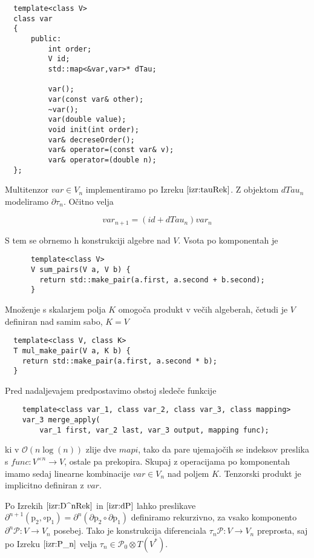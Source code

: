 \documentclass{article}
\newcommand{\dP}{\mathcal{P}}
\newcommand{\D}{\partial}
\newcommand{\sumd}{\tau}
\begin{document}
  \begin{lstlisting}
  template<class V>
  class var
  {
      public:
      	  int order;
          V id;
          std::map<&var,var>* dTau;
  
          var();
          var(const var& other);
          ~var();
          var(double value);
          void init(int order);
          var& decreseOrder();
          var& operator=(const var& v);
          var& operator=(double n);
  };       
  \end{lstlisting}
  
  Multitenzor $var\in V_n$ implementiramo po Izreku $\ref{izr:tauRek}$. Z objektom $dTau_n$ modeliramo $\D\sumd_{n}$. Očitno velja
  
  \begin{equation}\label{eq:var}
  var_{n+1}=(id+dTau_n)var_{n}
  \end{equation}
  
  S tem se obrnemo h konstrukciji algebre nad $V$. Vsota po komponentah je
    
    \begin{lstlisting}
      template<class V>
      V sum_pairs(V a, V b) {
        return std::make_pair(a.first, a.second + b.second);
      }
      \end{lstlisting}
      
Množenje s skalarjem polja $K$ omogoča produkt v večih algeberah, četudi je $V$ definiran nad samim sabo, $K=V$

\begin{lstlisting}
  template<class V, class K>
  T mul_make_pair(V a, K b) {
    return std::make_pair(a.first, a.second * b);
  }
  \end{lstlisting}      
  
   Pred nadaljevajem predpostavimo obstoj sledeče funkcije
    \begin{lstlisting}
    template<class var_1, class var_2, class var_3, class mapping>
    var_3 merge_apply(
        var_1 first, var_2 last, var_3 output, mapping func);
    \end{lstlisting}
    
    ki v $\mathcal{O}(n\log(n))$ zlije dve $\textit{mapi}$, tako da pare ujemajočih se indeksov preslika s $func: V^{\times n}\to V$, ostale pa prekopira. Skupaj z operacijama po komponentah imamo sedaj linearne kombinacije $var\in V_n$ nad poljem $K$. Tenzorski produkt je implicitno definiran z $var$.
    
     
      Po Izrekih $\ref{izr:D^nRek}$ in $\ref{izr:dP}$ lahko preslikave $\D^{n+1}(\mathrm{p}_2,\circ\mathrm{p}_1)=\D^n(\D\mathrm{p}_2\circ\D\mathrm{p}_1)$ definiramo rekurzivno, za vsako komponento $\D^n\dP:V\to V_n$ posebej. Tako je konstrukcija diferenciala $\sumd_n\dP:V\to V_n$ preprosta, saj po Izreku $\ref{izr:P_n}$ velja $\sumd_n\in\dP_0\otimes T(V^*)$.
        
\end{document}
